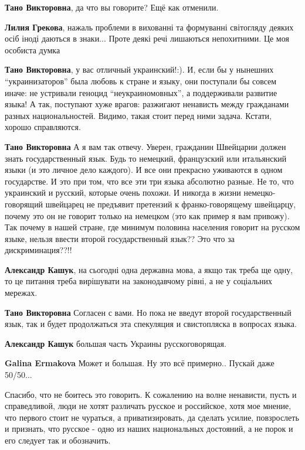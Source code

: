 \begin{itemize}
\begin{itemize}

\textbf{Тано Викторовна}, да что вы говорите? Ещё как отменили.

\textbf{Лилия Грекова}, нажаль проблеми в вихованні та формуванні світогляду деяких осіб іноді даються в знаки... Проте деякі речі лишаються непохитними. Це моя особиста думка

\textbf{Тано Викторовна}, у вас отличный украинский!:). И, если бы у нынешних
\enquote{украинизаторов} была любовь к стране и языку, они поступали бы совсем иначе:
не устривали геноцид \enquote{неукраиномовных}, а поддерживали развитие языка! А так,
поступают хуже врагов: разжигают ненависть между гражданами разных
национальностей. Видимо, такая стоит перед ними задача. Кстати, хорошо
справляются.

\textbf{Тано Викторовна} А я вам так отвечу. Уверен, гражданин Швейцарии должен
знать государственный язык. Будь то немецкий, французский или итальянский языки
(и это личное дело каждого). И все они прекрасно уживаются в одном государстве.
И это при том, что все эти три языка абсолютно разные. Не то, что украинский и
русский, которые очень похожи. И никогда в жизни немецко-говорящий швейцарец не
предъявит претензий к франко-говорящему швейцарцу, почему это он не говорит
только на немецком (это как пример я вам привожу). Так почему в нашей стране,
где минимум половина населения говорит на русском языке, нельзя ввести второй
государственный язык?? Это что за дискриминация??!!

\textbf{Александр Кашук}, на сьогодні одна державна мова, а якщо так треба ще
одну, то це питання треба вирішувати на законодавчому рівні, а не у соціальних
мережах.

\textbf{Тано Викторовна} Согласен с вами. Но пока не введут второй
государственный язык, так и будет продолжаться эта спекуляция и свистопляска в
вопросах языка.

\textbf{Александр Кашук} большая часть Украины русскоговорящая.

\textbf{Galina Ermakova} Может и большая. Ну это всё примерно.. Пускай даже 50/50...

\end{itemize}



Спасибо, что не боитесь это говорить. К сожалению на волне ненависти, пусть и
справедливой, люди не хотят различать русское и российское, хотя мое мнение,
что первого стоит не чураться, а приватизировать, да сделать усилие,
повзрослеть и признать, что русское - одно из наших национальных достояний, а
не порок и его следует так и обозначить.


\end{itemize}
